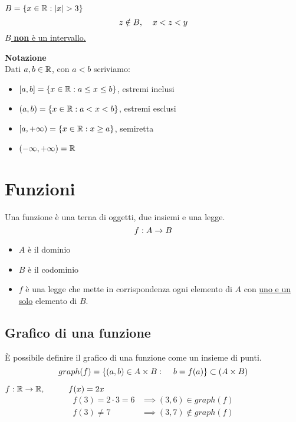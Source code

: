 \documentclass{article}
\begin{document}
\begin{eg}
\(B = \{ x \in \mathbb{R} : \lvert x \rvert > 3\}\)
\[z \notin B, \hspace{.4cm} x < z < y\]
\underline{\(B\) \textbf{non} è un intervallo.}
\end{eg}

\noindent\vspace{.2cm}\large\textbf{Notazione}\\
Dati \(a,b \in \mathbb{R}\), con \(a < b\) scriviamo:
\begin{itemize}
    \item \([a, b] = \{x \in \mathbb{R} : a \leq x \leq b\}\), estremi inclusi
    \item \((a, b) = \{x \in \mathbb{R} : a < x < b\}\), estremi esclusi
    \item \([a, +\infty) = \{x \in \mathbb{R} : x \geq a\}\), semiretta
    \item \((-\infty,+\infty) = \mathbb{R}\)
\end{itemize}

\pagebreak

\section{Funzioni}
Una funzione è una terna di oggetti, due insiemi e una legge.
\[f: A \rightarrow B\]
\begin{itemize}
    \item \(A\) è il dominio
    \item \(B\) è il codominio
    \item \(f\) è una legge che mette in corrispondenza ogni elemento di \(A\) con \underline{uno e un solo} elemento di \(B\).
\end{itemize}

\subsection{Grafico di una funzione}
\begin{dfn}
È possibile definire il grafico di una funzione come un insieme di punti.
\[graph(f) = \{(a,b) \in A \times B :\hspace{.4cm} b = f(a)\} \subset (A \times B)\]
\end{dfn}
\begin{eg}
\(f: \mathbb{R} \rightarrow \mathbb{R}, \hspace{1cm} f(x) = 2x\)
\begin{align*}
    f(3) = 2 \cdot 3 = 6 &\implies (3,6) \in graph(f) \\
    f(3) \neq 7 &\implies (3,7) \notin graph(f)
\end{align*}
\end{eg}
\end{document}
